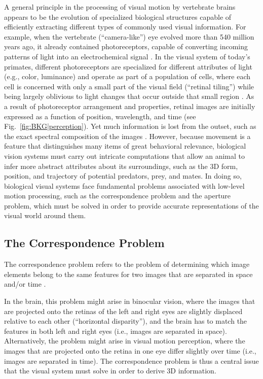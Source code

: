 A general principle in the processing of visual motion by vertebrate brains
appears to be the evolution of specialized biological structures capable
of efficiently extracting different types of commonly used visual information.
For example, when the vertebrate (``camera-like'') eye evolved 
more than 540 million years ago,
it already contained photoreceptors, capable of converting incoming
patterns of light into an electrochemical signal \citep{Lamb2007}.
In the visual system of today's primates, 
different photoreceptors are specialized for different attributes of light 
(e.g., color, luminance)
and operate as part of a population of cells,
where each cell is concerned with only a small part of the visual field
(``retinal tiling'') while being largely oblivious to light changes that occur
outside that small region \citep{NassiCallaway2009}.
As a result of photoreceptor arrangement and properties, retinal images are initially
expressed as a function of position, wavelength, and time
(see Fig.~\ref{fig:BKG|perception}).
Yet much information is lost from the outset,
such as the exact spectral composition of the images \citep{NassiCallaway2009}.
However, because movement is a feature that distinguishes many items of great
behavioral relevance, biological vision systems must carry out
intricate computations that allow an animal
to infer more abstract attributes about its surroundings,
such as the 3D form, position, and trajectory of potential predators, prey,
and mates.
In doing so, biological visual systems face fundamental problems associated
with low-level motion processing, 
such as the correspondence problem and the aperture problem,
which must be solved in order to provide
accurate representations of the visual world around them.


\subsection{The Correspondence Problem}
The correspondence problem \citep{Ullman1979}
refers to the problem of determining
which image elements belong to the same features
for two images that are separated in space and/or time
\citep{PackBorn2008}.

In the brain, this problem might arise in binocular vision, where the images that
are projected onto the retinas of the left and right eyes are slightly displaced
relative to each other (``horizontal disparity''), and the brain has to match
the features in both left and right eyes (i.e., images are separated in space).
Alternatively, the problem might arise in visual motion perception, where the
images that are projected onto the retina in one eye differ slightly over time
(i.e., images are separated in time).
The correspondence problem is thus a central issue that the visual system 
must solve in order to derive 3D information.

